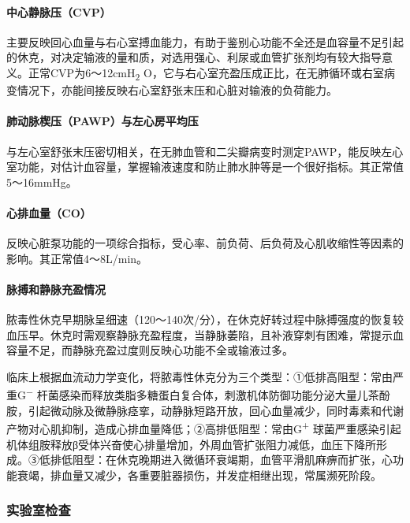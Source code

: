 \paragraph{中心静脉压（CVP）}

主要反映回心血量与右心室搏血能力，有助于鉴别心功能不全还是血容量不足引起的休克，对决定输液的量和质，对选用强心、利尿或血管扩张剂均有较大指导意义。正常CVP为6～12cmH\textsubscript{2}
O，它与右心室充盈压成正比，在无肺循环或右室病变情况下，亦能间接反映右心室舒张末压和心脏对输液的负荷能力。

\paragraph{肺动脉楔压（PAWP）与左心房平均压}

与左心室舒张末压密切相关，在无肺血管和二尖瓣病变时测定PAWP，能反映左心室功能，对估计血容量，掌握输液速度和防止肺水肿等是一个很好指标。其正常值5～16mmHg。

\paragraph{心排血量（CO）}

反映心脏泵功能的一项综合指标，受心率、前负荷、后负荷及心肌收缩性等因素的影响。其正常值4～8L/min。

\paragraph{脉搏和静脉充盈情况}

脓毒性休克早期脉呈细速（120～140次/分），在休克好转过程中脉搏强度的恢复较血压早。休克时需观察静脉充盈程度，当静脉萎陷，且补液穿刺有困难，常提示血容量不足，而静脉充盈过度则反映心功能不全或输液过多。

临床上根据血流动力学变化，将脓毒性休克分为三个类型：①低排高阻型：常由严重G\textsuperscript{−}
杆菌感染而释放类脂多糖蛋白复合体，刺激机体防御功能分泌大量儿茶酚胺，引起微动脉及微静脉痉挛，动静脉短路开放，回心血量减少，同时毒素和代谢产物对心肌抑制，造成心排血量降低；②高排低阻型：常由G\textsuperscript{+}
球菌严重感染引起机体组胺释放β受体兴奋使心排量增加，外周血管扩张阻力减低，血压下降所形成。③低排低阻型：在休克晚期进入微循环衰竭期，血管平滑肌麻痹而扩张，心功能衰竭，排血量又减少，各重要脏器损伤，并发症相继出现，常属濒死阶段。

\subsubsection{实验室检查}

